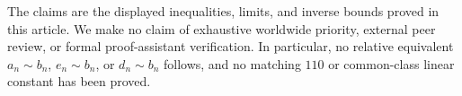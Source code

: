 The claims are the displayed inequalities, limits, and inverse bounds proved in this article. We make no claim of exhaustive worldwide priority, external peer review, or formal proof-assistant verification. In particular, no relative equivalent $a_n\sim b_n$, $e_n\sim b_n$, or $d_n\sim b_n$ follows, and no matching $110$ or common-class linear constant has been proved.
